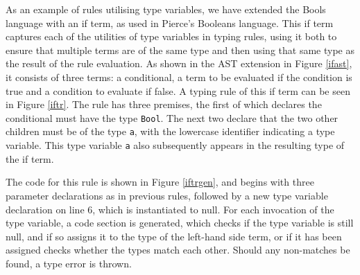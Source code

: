 \documentclass[nofilelist]{cslthse-msc}
\newcommand{\CR}[1]{\textcolor{green!60!black}{[\textbf{CR}:#1]}}
\begin{document}
%
As an example of rules utilising type variables, we have extended the Bools language with an if term, as used in Pierce's Booleans language\cite{Pierce}.
This if term captures each of the utilities of type variables in typing rules, using it both to ensure that multiple terms are of the same type and then using that same type as the result of the rule evaluation.
As shown in the AST extension in Figure \ref{ifast}, it consists of three terms: a conditional, a term to be evaluated if the condition is true and a condition to evaluate if false.
A typing rule of this if term can be seen in Figure \ref{iftr}.
The rule has three premises, the first of which declares the conditional must have the type \lstinline{Bool}.
The next two declare that the two other children must be of the type \lstinline{a}, with the lowercase identifier indicating a type variable.
This type variable \lstinline{a} also subsequently appears in the resulting type of the if term.

The code for this rule is shown in Figure \ref{iftrgen}, and begins with three parameter declarations as in previous rules, followed by a new type variable declaration on line 6, which is instantiated to null.
For each invocation of the type variable, a code section is generated, which checks if the type variable is still null, and if so assigns it to the type of the left-hand side term, or if it has been assigned checks whether the types match each other. Should any non-matches be found, a type error is thrown.
\end{document}

